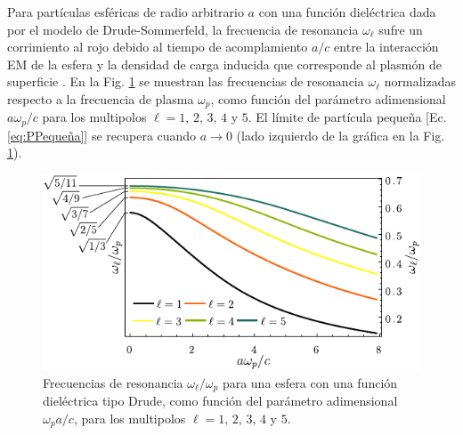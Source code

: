 Para partículas esféricas de radio arbitrario $a$ con una función dieléctrica dada por el modelo de Drude-Sommerfeld, la frecuencia de resonancia $\omega_\ell$ sufre un corrimiento al rojo debido al tiempo de acomplamiento $a/c$ entre la interacción EM de la esfera y  la densidad de carga inducida que corresponde al plasmón de superficie \cite{aizpurua1998coupling}.  En la Fig.  \ref{fig:NormalModes} se muestran las frecuencias de resonancia $\omega_\ell$ normalizadas respecto a la frecuencia de plasma $\omega_p$, como función del parámetro adimensional $a\omega_p / c$ para los multipolos $\ell = 1,\,2,\,3,\,4$ y $5$. El límite de partícula pequeña [Ec.  \eqref{eq:PPequeña}]	se recupera cuando  $a\to 0$ (lado izquierdo de la gráfica en la Fig.  \ref{fig:NormalModes}).  

	\begin{figure}[h!]\centering
		\includegraphics[scale=1]{1-Teoria/figs/1-4-DrudeMultipoles.pdf}\vspace*{-1em}
	\caption{Frecuencias de resonancia $\omega_\ell/\omega_p$ para una esfera con una función dieléctrica tipo Drude, como función del parámetro adimensional  $\omega_p a / c$, para los multipolos $\ell = 1,\,2,\,3,\,4$ y $5$. }
	\label{fig:NormalModes}
	\end{figure}		

